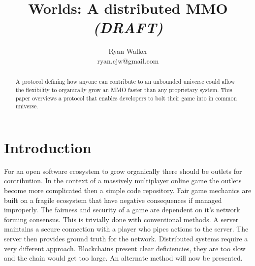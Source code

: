 \documentclass[runningheads,a4paper]{llncs}
\begin{document}
\def \SystemName {Worlds} %

\mainmatter  %

\title{\SystemName: A distributed MMO \textit{(DRAFT)}}

\author{Ryan Walker\\
				ryan.cjw@gmail.com}

\institute{} %

\maketitle

\begin{abstract}
A protocol defining how anyone can contribute to an unbounded universe could allow the flexibility to organically grow an MMO faster than any proprietary system. This paper overviews a protocol that enables developers to bolt their game into in common universe. 
\end{abstract}

\section{Introduction}
For an open software ecosystem to grow organically there should be outlets for contribution. In the context of a massively multiplayer online game the outlets become more complicated then a simple code repository. Fair game mechanics are built on a fragile ecosystem that have negative consequences if managed improperly. The fairness and security of a game are dependent on it's network forming consensus. This is trivially done with conventional methods. A server maintains a secure connection with a player who pipes actions to the server. The server then provides ground truth for the network. Distributed systems require a very different approach. Blockchains present clear deficiencies, they are too slow and the chain would get too large. An alternate method will now be presented.
\end{document}
